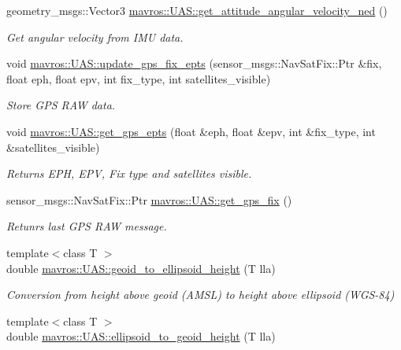 \begin{DoxyCompactItemize}
geometry\+\_\+msgs\+::\+Vector3 \mbox{\hyperlink{group__nodelib_gad8c9d0e754109b465ee25115ef55860e}{mavros\+::\+U\+A\+S\+::get\+\_\+attitude\+\_\+angular\+\_\+velocity\+\_\+ned}} ()
\begin{DoxyCompactList}\small\item\em Get angular velocity from I\+MU data. \end{DoxyCompactList}\item 
void \mbox{\hyperlink{group__nodelib_ga5230fcf5827b4a682efe35b91a66152b}{mavros\+::\+U\+A\+S\+::update\+\_\+gps\+\_\+fix\+\_\+epts}} (sensor\+\_\+msgs\+::\+Nav\+Sat\+Fix\+::\+Ptr \&fix, float eph, float epv, int fix\+\_\+type, int satellites\+\_\+visible)
\begin{DoxyCompactList}\small\item\em Store G\+PS R\+AW data. \end{DoxyCompactList}\item 
void \mbox{\hyperlink{group__nodelib_ga17cd0e13d3dce3ec697646bb543ba6e7}{mavros\+::\+U\+A\+S\+::get\+\_\+gps\+\_\+epts}} (float \&eph, float \&epv, int \&fix\+\_\+type, int \&satellites\+\_\+visible)
\begin{DoxyCompactList}\small\item\em Returns E\+PH, E\+PV, Fix type and satellites visible. \end{DoxyCompactList}\item 
sensor\+\_\+msgs\+::\+Nav\+Sat\+Fix\+::\+Ptr \mbox{\hyperlink{group__nodelib_gac4ba509d29c876694293856f39308625}{mavros\+::\+U\+A\+S\+::get\+\_\+gps\+\_\+fix}} ()
\begin{DoxyCompactList}\small\item\em Retunrs last G\+PS R\+AW message. \end{DoxyCompactList}\item 
{\footnotesize template$<$class T $>$ }\\double \mbox{\hyperlink{group__nodelib_ga4f50b74e553d2c2b2a3c4ea02213fd89}{mavros\+::\+U\+A\+S\+::geoid\+\_\+to\+\_\+ellipsoid\+\_\+height}} (T lla)
\begin{DoxyCompactList}\small\item\em Conversion from height above geoid (A\+M\+SL) to height above ellipsoid (W\+G\+S-\/84) \end{DoxyCompactList}\item 
{\footnotesize template$<$class T $>$ }\\double \mbox{\hyperlink{group__nodelib_gaf8185c59b4aa8840717d676d247ea99d}{mavros\+::\+U\+A\+S\+::ellipsoid\+\_\+to\+\_\+geoid\+\_\+height}} (T lla)

\end{DoxyCompactItemize}
